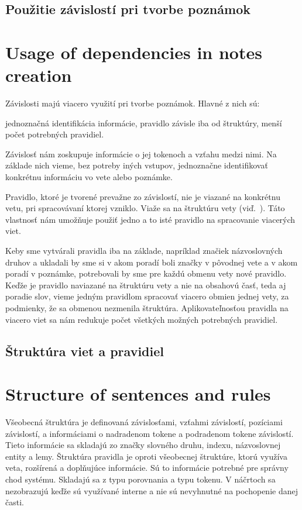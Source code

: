 %
%
{
	\subsection{Použitie závislostí pri tvorbe poznámok}
}
{
	\section{Usage of dependencies in notes creation}
}
\label{subsection:use_of_dependencies_in_notes_creation}
Závislosti majú viacero využití pri tvorbe poznámok. Hlavné z nich sú:

\begin{my_itemize}
	\myitem jednoznačná identifikácia informácie,
	\myitem pravidlo závisle iba od štruktúry,
	\myitem menší počet potrebných pravidiel.
\end{my_itemize}

Závislosť nám zoskupuje informácie o jej tokenoch a vzťahu medzi nimi. Na základe nich vieme, bez potreby iných vstupov, jednoznačne identifikovať konkrétnu informáciu vo vete alebo poznámke.

Pravidlo, ktoré je tvorené prevažne zo závislostí, nie je viazané na konkrétnu vetu, pri spracovávaní ktorej vzniklo. Viaže sa na štruktúru vety (viď.~). Táto vlastnosť nám umožňuje použiť jedno a to isté pravidlo na spracovanie viacerých viet.

Keby sme vytvárali pravidla iba na základe, napríklad značiek názvoslovných druhov a ukladali by sme si v akom poradí boli značky v pôvodnej vete a v akom poradí v poznámke, potrebovali by sme pre každú obmenu vety nové pravidlo. Keďže je pravidlo naviazané na štruktúru vety a nie na obsahovú časť, teda aj poradie slov, vieme jedným pravidlom spracovať viacero obmien jednej vety, za podmienky, že sa obmenou nezmenila štruktúra. Aplikovateľnosťou pravidla na viacero viet sa nám redukuje počet všetkých možných potrebných pravidiel.

%
%
{
	\subsection{Štruktúra viet a pravidiel}
}
{
	\section{Structure of sentences and rules}
}
\label{subsection:structure_of_sentences_and_rules}
Všeobecná štruktúra je definovaná závislosťami, vzťahmi závislostí, pozíciami závislostí, a informáciami o nadradenom tokene a podradenom tokene závislostí. Tieto informácie sa skladajú zo značky slovného druhu, indexu, názvoslovnej entity a lemy. Štruktúra pravidla je oproti všeobecnej štruktúre, ktorú využíva veta, rozšírená a doplňujúce informácie. Sú to informácie potrebné pre správny chod systému. Skladajú sa z typu porovnania a typu tokenu. V náčrtoch sa nezobrazujú keďže sú využívané interne a nie sú nevyhnutné na pochopenie danej časti.

